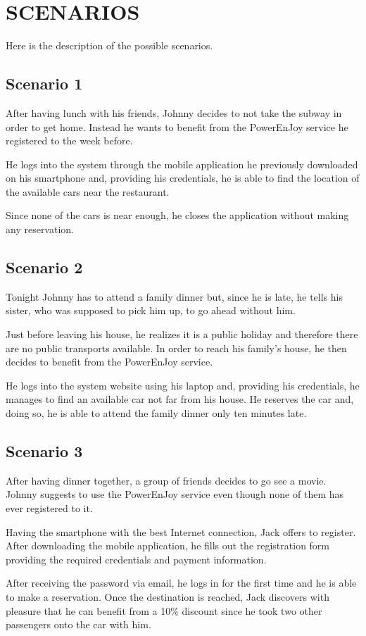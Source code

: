 \section{SCENARIOS}
Here is the description of the possible scenarios.
\subsection{Scenario 1}
After having lunch with his friends, Johnny decides to not take the subway in order to get home. Instead he wants to benefit from the PowerEnJoy service he registered to the week before. 

He logs into the system through the mobile application he previously downloaded on his smartphone and, providing his credentials, he is able to find the location of the available cars near the restaurant. 

Since none of the cars is near enough, he closes the application without making any reservation. 
\subsection{Scenario 2}
Tonight Johnny has to attend a family dinner but, since he is late, he tells his sister, who was supposed to pick him up, to go ahead without him. 

Just before leaving his house, he realizes it is a public holiday and therefore there are no public transports available. In order to reach his family's house, he then decides to benefit from the PowerEnJoy service. 

He logs into the system website using his laptop and, providing his credentials, he manages to find an available car not far from his house. He reserves the car and, doing so, he is able to attend the family dinner only ten minutes late.
\subsection{Scenario 3}
After having dinner together, a group of friends decides to go see a movie. Johnny suggests to use the PowerEnJoy service even though none of them has ever registered to it. 

Having the smartphone with the best Internet connection, Jack offers to register. After downloading the mobile application, he fills out the registration form providing the required credentials and payment information. 

After receiving the password via email, he logs in for the first time and he is able to make a reservation. Once the destination is reached, Jack discovers with pleasure that he can benefit from a 10\% discount since he took two other passengers onto the car with him. 


